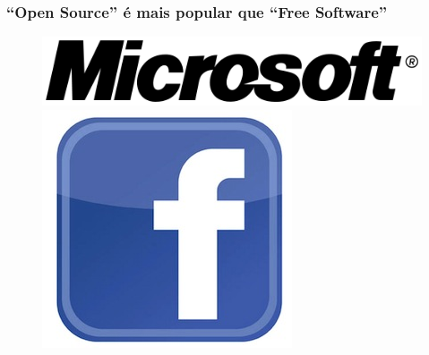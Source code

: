 \documentclass[xcolor=dvipsnames]{beamer}
\begin{document}
\begin{frame}
	\frametitle{``Open Source'' é mais popular que ``Free Software''}
	\begin{figure}
	\begin{center}
	\hspace{0.15cm}\includegraphics[scale=0.20]{microsoft.png}
	\hspace{0.15cm}\includegraphics[scale=0.15]{facebook.jpg} \\[0.3cm]

\end{center}
\end{figure}
\end{frame}
\end{document}
